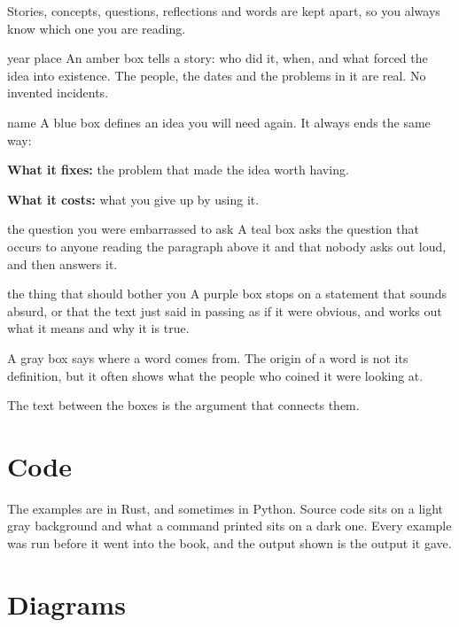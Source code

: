 Stories, concepts, questions, reflections and words are kept apart, so you
always know which one you are reading.

\begin{history}{year \textperiodcentered{} place}
An amber box tells a story: who did it, when, and what forced the idea into
existence. The people, the dates and the problems in it are real. No invented
incidents.
\end{history}

\begin{concept}{name}
A blue box defines an idea you will need again. It always ends the same way:

\textbf{What it fixes:} the problem that made the idea worth having.

\textbf{What it costs:} what you give up by using it.
\end{concept}

\begin{question}{the question you were embarrassed to ask}
A teal box asks the question that occurs to anyone reading the paragraph above
it and that nobody asks out loud, and then answers it.
\end{question}

\begin{reflection}{the thing that should bother you}
A purple box stops on a statement that sounds absurd, or that the text just said
in passing as if it were obvious, and works out what it means and why it is
true.
\end{reflection}

\begin{etymology}
A gray box says where a word comes from. The origin of a word is not its
definition, but it often shows what the people who coined it were looking at.
\end{etymology}

The text between the boxes is the argument that connects them.

\section*{Code}

The examples are in Rust, and sometimes in Python. Source code sits on a light
gray background and what a command printed sits on a dark one. Every example was
run before it went into the book, and the output shown is the output it gave.

\section*{Diagrams}

